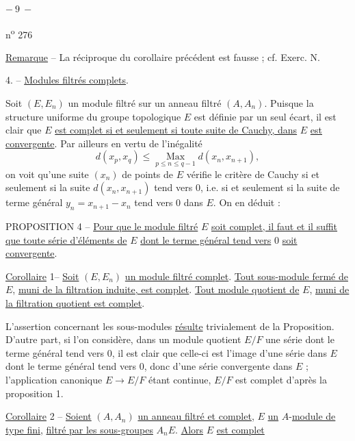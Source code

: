 
\begin{center}$-\ 9\ -$\end{center}\hfill n\textsuperscript{o} 276

\uline{Remarque} -- La réciproque du corollaire précédent est fausse ; cf. Exerc. N.

4. -- \uline{Modules filtrés complets}.

Soit $(E,E_n)$ un module filtré sur un anneau filtré $(A,A_n)$. Puisque la structure uniforme du groupe topologique $E$ est définie par un seul écart, il est clair que $E$ \uline{est complet si et seulement si toute suite de Cauchy, dans} $E$ \uline{est convergente}. Par ailleurs en vertu de l'inégalité
\[
d(x_p,x_q)\leqslant\underset{p\leqslant n\leqslant q-1}{\operatorname{Max}}d(x_n,x_{n+1}),
\]
on voit qu'une suite $(x_n)$ de points de $E$ vérifie le critère de Cauchy si et seulement si la suite $d(x_n,x_{n+1})$ tend vers $0$, i.e. si et seulement si la suite de terme général $y_n=x_{n+1}-x_n$ tend vers $0$ dans $E$. On en déduit :

PROPOSITION 4 -- \uline{Pour que le module filtré} $E$ \uline{soit complet, il faut et il suffit que toute série d'éléments de} $E$ \uline{dont le terme général tend vers} $0$ \uline{soit convergente}.

\uline{Corollaire} 1-- \uline{Soit} $(E,E_n)$ \uline{un module filtré complet}. \uline{Tout sous-module fermé de} $E$, \uline{muni de la filtration induite, est complet}. \uline{Tout module quotient de} $E$, \uline{muni de la filtration quotient est complet}.

L'assertion concernant les sous-modules \uline{résulte} trivialement de la Proposition. D'autre part, si l'on considère, dans un module quotient $E/F$ une série dont le terme général tend vers $0$, il est clair que celle-ci est l'image d'une série dans $E$ dont le terme général tend vers $0$, donc d'une série convergente dans $E$ ; l'application canonique $E\to E/F$ étant continue, $E/F$ est complet d'après la proposition 1.

\uline{Corollaire} 2 -- \uline{Soient} $(A,A_n)$ \uline{un anneau filtré et complet}, $E$ \uline{un} $A$-\uline{module de type fini}, \uline{filtré par les sous-groupes} $A_nE$. \uline{Alors} $E$ \uline{est complet}

